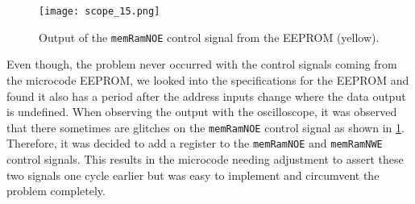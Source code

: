 \begin{figure}[t]
  \texttt{[image: scope\_15.png]}
  \caption{Output of the \texttt{memRamNOE} control signal from the \gls{EEPROM} (yellow).}
  \label{fig:EEPROMGlitch}
\end{figure}
Even though, the problem never occurred with the control signals coming from the microcode \gls{EEPROM}, we looked into the specifications for the \gls{EEPROM} and found it also has a period after the address inputs change where the data output is undefined.
When observing the output with the oscilloscope, it was observed that there sometimes are glitches on the \texttt{memRamNOE} control signal as shown in \cref{fig:EEPROMGlitch}.
Therefore, it was decided to add a register to the \texttt{memRamNOE} and \texttt{memRamNWE} control signals.
This results in the microcode needing adjustment to assert these two signals one cycle earlier but was easy to implement and circumvent the problem completely.